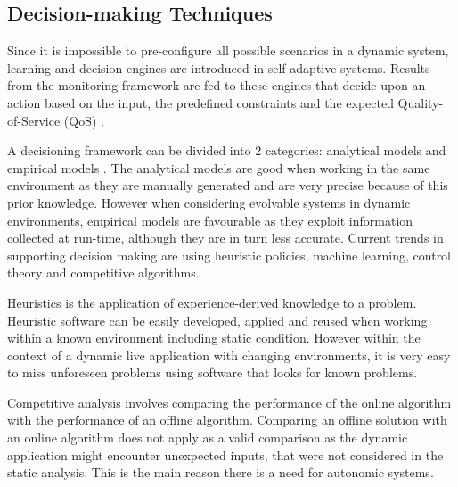 \subsection{Decision-making Techniques}
\label{sec:decisions}
%
Since it is impossible to pre-configure all possible scenarios in a dynamic system, learning and decision engines are introduced in self-adaptive systems. Results from the monitoring framework are fed to these engines that decide upon an action based on the input, the predefined constraints and the expected Quality-of-Service (QoS) \cite{evolvable}. 

A decisioning framework can be divided into 2 categories: analytical models and empirical models \cite{evolvable}. The analytical models are good when working in the same environment as they are manually generated and are very precise because of this prior knowledge. However when considering evolvable systems in dynamic environments, empirical models are favourable as they exploit information collected at run-time, although they are in turn less accurate. Current trends in supporting decision making are using heuristic policies, machine learning, control theory and competitive algorithms. 

Heuristics is the application of experience-derived knowledge to a problem. Heuristic software can be easily developed, applied and reused when working within a known environment including static condition. However within the context of a dynamic live application with changing environments, it is very easy to miss unforeseen problems using software that looks for known problems. %

Competitive analysis involves comparing the performance of the online algorithm with the performance of an offline algorithm. Comparing an offline solution with an online algorithm does not apply as a valid comparison as the dynamic application might encounter unexpected inputs, that were not considered in the static analysis. This is the main reason there is a need for autonomic systems. 
%
